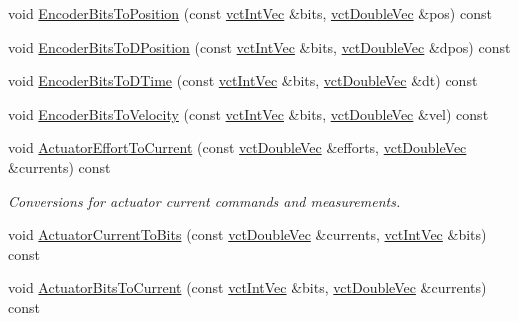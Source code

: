 \begin{DoxyCompactItemize}
void \hyperlink{classsaw_robot_i_o1394_1_1osa_robot1394_a965bfe1b495adbb15b851db7a4e6284f}{Encoder\-Bits\-To\-Position} (const \hyperlink{vct_dynamic_vector_types_8h_a47260df0b570a25352b3f318ed0b4c4e}{vct\-Int\-Vec} \&bits, \hyperlink{vct_dynamic_vector_types_8h_ade4b3068c86fb88f41af2e5187e491c2}{vct\-Double\-Vec} \&pos) const 
\item 
void \hyperlink{classsaw_robot_i_o1394_1_1osa_robot1394_af2d53c1c54f1ce55918306b2e9906941}{Encoder\-Bits\-To\-D\-Position} (const \hyperlink{vct_dynamic_vector_types_8h_a47260df0b570a25352b3f318ed0b4c4e}{vct\-Int\-Vec} \&bits, \hyperlink{vct_dynamic_vector_types_8h_ade4b3068c86fb88f41af2e5187e491c2}{vct\-Double\-Vec} \&dpos) const 
\item 
void \hyperlink{classsaw_robot_i_o1394_1_1osa_robot1394_a25fd6e62f012bee2eaae831fca09c3a7}{Encoder\-Bits\-To\-D\-Time} (const \hyperlink{vct_dynamic_vector_types_8h_a47260df0b570a25352b3f318ed0b4c4e}{vct\-Int\-Vec} \&bits, \hyperlink{vct_dynamic_vector_types_8h_ade4b3068c86fb88f41af2e5187e491c2}{vct\-Double\-Vec} \&dt) const 
\item 
void \hyperlink{classsaw_robot_i_o1394_1_1osa_robot1394_a1a38e1c16ad3a8dd7b3294a062893917}{Encoder\-Bits\-To\-Velocity} (const \hyperlink{vct_dynamic_vector_types_8h_a47260df0b570a25352b3f318ed0b4c4e}{vct\-Int\-Vec} \&bits, \hyperlink{vct_dynamic_vector_types_8h_ade4b3068c86fb88f41af2e5187e491c2}{vct\-Double\-Vec} \&vel) const 
\item 
void \hyperlink{classsaw_robot_i_o1394_1_1osa_robot1394_a25209a86c47b754cf7d9290a24a9afa1}{Actuator\-Effort\-To\-Current} (const \hyperlink{vct_dynamic_vector_types_8h_ade4b3068c86fb88f41af2e5187e491c2}{vct\-Double\-Vec} \&efforts, \hyperlink{vct_dynamic_vector_types_8h_ade4b3068c86fb88f41af2e5187e491c2}{vct\-Double\-Vec} \&currents) const 
\begin{DoxyCompactList}\small\item\em Conversions for actuator current commands and measurements. \end{DoxyCompactList}\item 
void \hyperlink{classsaw_robot_i_o1394_1_1osa_robot1394_ad7c3019c97632013924763fb80986b02}{Actuator\-Current\-To\-Bits} (const \hyperlink{vct_dynamic_vector_types_8h_ade4b3068c86fb88f41af2e5187e491c2}{vct\-Double\-Vec} \&currents, \hyperlink{vct_dynamic_vector_types_8h_a47260df0b570a25352b3f318ed0b4c4e}{vct\-Int\-Vec} \&bits) const 
\item 
void \hyperlink{classsaw_robot_i_o1394_1_1osa_robot1394_a9d27b2739d3ce56722f981f26f016c56}{Actuator\-Bits\-To\-Current} (const \hyperlink{vct_dynamic_vector_types_8h_a47260df0b570a25352b3f318ed0b4c4e}{vct\-Int\-Vec} \&bits, \hyperlink{vct_dynamic_vector_types_8h_ade4b3068c86fb88f41af2e5187e491c2}{vct\-Double\-Vec} \&currents) const 

\end{DoxyCompactItemize}
